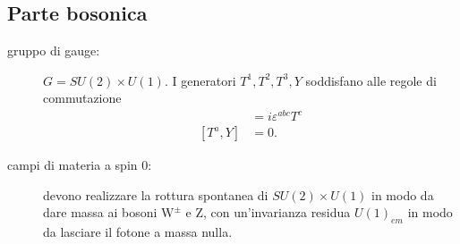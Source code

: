 \documentclass[italian,a4paper]{article}
\theoremstyle{definition}
\newcommand{\zboson}{\ensuremath{\mathrm{Z}}}
\newcommand{\wboson}{\ensuremath{\mathrm{W}}}
\begin{document}
\subsection{Parte bosonica}
\begin{description}
    \item[gruppo di gauge:]
$G = SU(2) \times U(1)$. I generatori $T^1,T^2, T^3, Y$ soddisfano alle regole di commutazione
\begin{align*}
    [T^a, T^b] &= i \varepsilon^{abc}T^c\\
    [T^a, Y] &= 0.
\end{align*}
\item[campi di materia a spin $0$:] devono realizzare la rottura spontanea
    di $SU(2)\times U(1)$ in modo da dare massa ai bosoni $\wboson^{\pm}$ e
    $\zboson$, con un'invarianza residua $U(1)_{em}$ in modo da lasciare
    il fotone a massa nulla.


\end{description}
\end{document}
